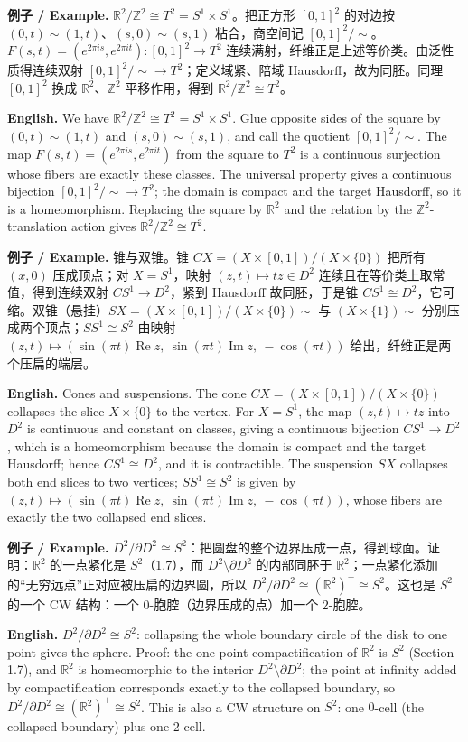 \documentclass[UTF8,11pt,a4paper]{ctexart}
\newcommand{\EN}[1]{\par\noindent\textbf{English.} #1\par}
\newcommand{\EX}[2]{\par\noindent\textbf{例子 / Example.} #1\par\EN{#2}}
\begin{document}
\EX{$\mathbb R^2/\mathbb Z^2\cong T^2=S^1\times S^1$。把正方形 $[0,1]^2$ 的对边按 $(0,t)\sim(1,t)$、$(s,0)\sim(s,1)$ 粘合，商空间记 $[0,1]^2/{\sim}$。$F(s,t)=(e^{2\pi is},e^{2\pi it}):[0,1]^2\to T^2$ 连续满射，纤维正是上述等价类。由泛性质得连续双射 $[0,1]^2/{\sim}\to T^2$；定义域紧、陪域 Hausdorff，故为同胚。同理 $[0,1]^2$ 换成 $\mathbb R^2$、$\mathbb Z^2$ 平移作用，得到 $\mathbb R^2/\mathbb Z^2\cong T^2$。}{We have $\mathbb R^2/\mathbb Z^2\cong T^2=S^1\times S^1$. Glue opposite sides of the square by $(0,t)\sim(1,t)$ and $(s,0)\sim(s,1)$, and call the quotient $[0,1]^2/{\sim}$. The map $F(s,t)=(e^{2\pi is},e^{2\pi it})$ from the square to $T^2$ is a continuous surjection whose fibers are exactly these classes. The universal property gives a continuous bijection $[0,1]^2/{\sim}\to T^2$; the domain is compact and the target Hausdorff, so it is a homeomorphism. Replacing the square by $\mathbb R^2$ and the relation by the $\mathbb Z^2$-translation action gives $\mathbb R^2/\mathbb Z^2\cong T^2$.}

\EX{锥与双锥。锥 $CX=(X\times[0,1])/(X\times\{0\})$ 把所有 $(x,0)$ 压成顶点；对 $X=S^1$，映射 $(z,t)\mapsto tz\in D^2$ 连续且在等价类上取常值，得到连续双射 $CS^1\to D^2$，紧到 Hausdorff 故同胚，于是锥 $CS^1\cong D^2$，它可缩。双锥（悬挂）$SX=(X\times[0,1])/(X\times\{0\})\sim$ 与 $(X\times\{1\})\sim$ 分别压成两个顶点；$SS^1\cong S^2$ 由映射 $(z,t)\mapsto(\sin(\pi t)\operatorname{Re}z,\ \sin(\pi t)\operatorname{Im}z,\ -\cos(\pi t))$ 给出，纤维正是两个压扁的端层。}{Cones and suspensions. The cone $CX=(X\times[0,1])/(X\times\{0\})$ collapses the slice $X\times\{0\}$ to the vertex. For $X=S^1$, the map $(z,t)\mapsto tz$ into $D^2$ is continuous and constant on classes, giving a continuous bijection $CS^1\to D^2$, which is a homeomorphism because the domain is compact and the target Hausdorff; hence $CS^1\cong D^2$, and it is contractible. The suspension $SX$ collapses both end slices to two vertices; $SS^1\cong S^2$ is given by $(z,t)\mapsto(\sin(\pi t)\operatorname{Re}z,\ \sin(\pi t)\operatorname{Im}z,\ -\cos(\pi t))$, whose fibers are exactly the two collapsed end slices.}

\EX{$D^2/\partial D^2\cong S^2$：把圆盘的整个边界压成一点，得到球面。证明：$\mathbb R^2$ 的一点紧化是 $S^2$（1.7），而 $D^2\setminus\partial D^2$ 的内部同胚于 $\mathbb R^2$；一点紧化添加的“无穷远点”正对应被压扁的边界圆，所以 $D^2/\partial D^2\cong(\mathbb R^2)^+\cong S^2$。这也是 $S^2$ 的一个 CW 结构：一个 $0$-胞腔（边界压成的点）加一个 $2$-胞腔。}{$D^2/\partial D^2\cong S^2$: collapsing the whole boundary circle of the disk to one point gives the sphere. Proof: the one-point compactification of $\mathbb R^2$ is $S^2$ (Section 1.7), and $\mathbb R^2$ is homeomorphic to the interior $D^2\setminus\partial D^2$; the point at infinity added by compactification corresponds exactly to the collapsed boundary, so $D^2/\partial D^2\cong(\mathbb R^2)^+\cong S^2$. This is also a CW structure on $S^2$: one $0$-cell (the collapsed boundary) plus one $2$-cell.}
\end{document}
